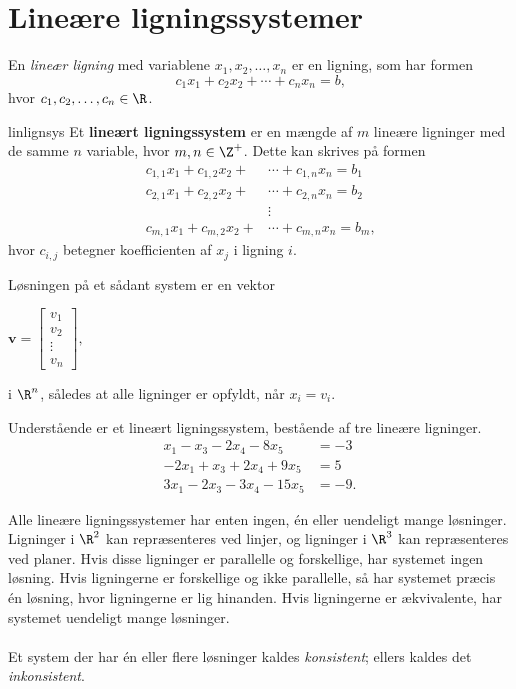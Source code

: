 \section{Lineære ligningssystemer }
%
En \textit{lineær ligning} med variablene $x_1,x_2,\ldots ,x_n$ er en ligning, som har formen
$$ c_1x_1+c_2x_2+\cdots+c_nx_n=b \text{,}$$ 
hvor $c_1,c_2,\ldots,c_n \in \R$. 
%
\begin{defn}{}{linlignsys}
Et \textbf{lineært ligningssystem} er en mængde af $m$ lineære ligninger med de samme $n$ variable, hvor $m, n \in \Z^+$.
Dette kan skrives på formen
\begin{align*}
c_{1,1}x_1+c_{1,2}x_2+&\cdots+c_{1,n}x_n=b_1\\
c_{2,1}x_1+c_{2,2}x_2+&\cdots+c_{2,n}x_n=b_2\\
&\vdots\\
c_{m,1}x_1+c_{m,2}x_2+&\cdots +c_{m,n}x_n=b_m
\text{,}
\end{align*}
hvor $c_{i,j}$ betegner koefficienten af $x_j$ i ligning $i$.
\end{defn}
\noindent
Løsningen på et sådant system er en vektor
\begin{center}
$
\mathbf{v} = 
\begin{bmatrix}
v_1\\
v_2\\
\vdots\\
v_n
\end{bmatrix},
$
\end{center}
i $\R ^n$, således at alle ligninger er opfyldt, når $x_i = v_i$.
%
\\
%
\begin{eks}
\label{eks:lignsys}
Understående er et lineært ligningssystem, bestående af tre lineære ligninger.
%
\begin{align*}
x_1-x_3-2x_4-8x_5&=-3 \\
-2x_1+x_3+2x_4+9x_5&=5 \\
3x_1-2x_3-3x_4-15x_5&=-9.
\end{align*}
%
%
%
\end{eks}
%
Alle lineære ligningssystemer har enten ingen, én eller uendeligt mange løsninger.
Ligninger i $\R^2$ kan repræsenteres ved linjer, og ligninger i $\R^3$ kan repræsenteres ved planer.
Hvis disse ligninger er parallelle og forskellige, har systemet ingen løsning.
Hvis ligningerne er forskellige og ikke parallelle, så har systemet præcis én løsning, hvor ligningerne er lig hinanden.
Hvis ligningerne er ækvivalente, har systemet uendeligt mange løsninger.
\\\\
%
Et system der har én eller flere løsninger kaldes \textit{konsistent}; ellers kaldes det \textit{inkonsistent}.
%
%
